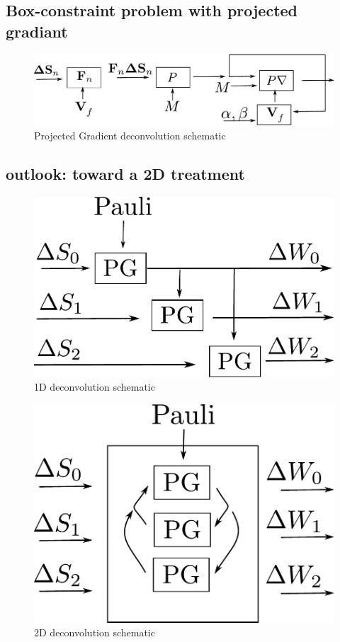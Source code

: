 \documentclass[english]{article}
\begin{document}

\subsection{Box-constraint problem with projected gradiant}


\begin{figure}[H]
\centering
\includegraphics[scale = 0.5]{ProjGrad_deconvolution}
\caption{Projected Gradient deconvolution schematic}
\label{fig: ProjGrad deconvolution}
\end{figure}

\subsection{outlook: toward a 2D treatment}


\begin{figure}[H]
\centering
\includegraphics[scale = 0.5]{1D_deconvolution}
\caption{1D deconvolution schematic}
\label{fig: 1D deconvolution}
\end{figure}

\begin{figure}[H]
\centering
\includegraphics[scale = 0.5]{2D_deconvolution}
\caption{2D deconvolution schematic}
\label{fig: 2D deconvolution}
\end{figure}
\end{document}
